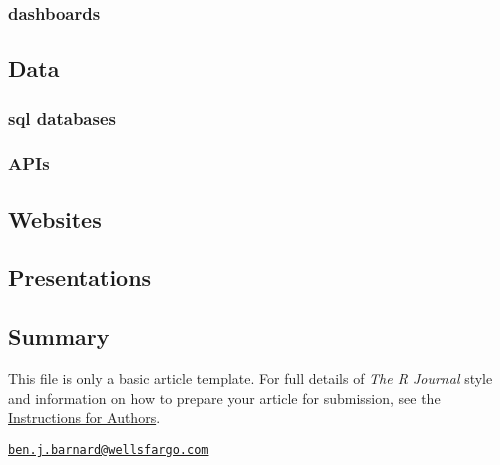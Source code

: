 \hypertarget{dashboards}{%
\subsubsection{dashboards}\label{dashboards}}

\hypertarget{data}{%
\subsection{Data}\label{data}}

\hypertarget{sql-databases}{%
\subsubsection{sql databases}\label{sql-databases}}

\hypertarget{apis}{%
\subsubsection{APIs}\label{apis}}

\hypertarget{websites}{%
\subsection{Websites}\label{websites}}

\hypertarget{presentations}{%
\subsection{Presentations}\label{presentations}}

\hypertarget{summary}{%
\subsection{Summary}\label{summary}}

This file is only a basic article template. For full details of
\emph{The R Journal} style and information on how to prepare your
article for submission, see the
\href{https://journal.r-project.org/share/author-guide.pdf}{Instructions
for Authors}.




\address{%
Ben Barnard\\
Wells Fargo\\
line 1\\ line 2\\
}
\href{mailto:ben.j.barnard@wellsfargo.com}{\nolinkurl{ben.j.barnard@wellsfargo.com}}

